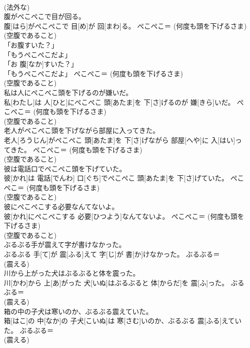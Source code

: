 \documentclass[8pt]{extreport}
\begin{document}
\begin{CJK}{UTF8}{min}
{\\	(法外な) 
\\	腹がぺこぺこで目が回る。	
\\	腹[はら]がぺこぺこで 目[め]が 回[まわ]る。	ぺこぺこ＝ (何度も頭を下げるさま) 
\\	(空腹であること)
\\	「お腹すいた？」 
\\	「もうぺこぺこだよ」	
\\	「お 腹[なか]すいた？」 
\\	「もうぺこぺこだよ」	ぺこぺこ＝ (何度も頭を下げるさま) 
\\	(空腹であること)
\\	私は人にぺこぺこ頭を下げるのが嫌いだ。	
\\	私[わたし]は 人[ひと]にぺこぺこ 頭[あたま]を 下[さ]げるのが 嫌[きら]いだ。	ぺこぺこ＝ (何度も頭を下げるさま) 
\\	(空腹であること)
\\	老人がぺこぺこ頭を下げながら部屋に入ってきた。	
\\	老人[ろうじん]がぺこぺこ 頭[あたま]を 下[さ]げながら 部屋[へや]に 入[はい]ってきた。	ぺこぺこ＝ (何度も頭を下げるさま) 
\\	(空腹であること)
\\	彼は電話口でぺこぺこ頭を下げていた。	
\\	彼[かれ]は 電話[でんわ] 口[ぐち]でぺこぺこ 頭[あたま]を 下[さ]げていた。	ぺこぺこ＝ (何度も頭を下げるさま) 
\\	(空腹であること)
\\	彼にぺこぺこする必要なんてないよ。	
\\	彼[かれ]にぺこぺこする 必要[ひつよう]なんてないよ。	ぺこぺこ＝ (何度も頭を下げるさま) 
\\	(空腹であること)
\\	ぶるぶる手が震えて字が書けなかった。	
\\	ぶるぶる 手[て]が 震[ふる]えて 字[じ]が 書[か]けなかった。	ぶるぶる＝ 
\\	(震える)
\\	川から上がった犬はぶるぶると体を震った。	
\\	川[かわ]から 上[あ]がった 犬[いぬ]はぶるぶると 体[からだ]を 震[ふ]った。	ぶるぶる＝ 
\\	(震える)
\\	箱の中の子犬は寒いのか、ぶるぶる震えていた。	
\\	箱[はこ]の 中[なか]の 子犬[こいぬ]は 寒[さむ]いのか、ぶるぶる 震[ふる]えていた。	ぶるぶる＝ 
\\	(震える)
}
\end{CJK}
\end{document}
